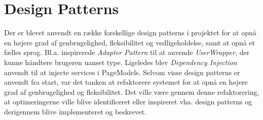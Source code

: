 \section{Design Patterns}
\label{sec:design-patterns}
Der er blevet anvendt en række forskellige design patterns i projektet for at opnå en højere grad af genbrugelighed, fleksibilitet og vedligeholdelse, samt at opnå et fælles sprog.
Bl.a. inspirerede \emph{Adapter Pattern} til at anvende \emph{UserWrapper}, der kunne håndtere brugeren uanset type. Ligeledes blev \emph{Dependency Injection} anvendt til at injecte services i PageModels.
Selvom visse design patterns er anvendt fra start, var det tanken at refaktorere systemet for at opnå en højere grad af genbrugelighed og fleksibilitet.
Det ville være gennem denne refaktorering, at optimeringerne ville blive identificeret eller inspireret vha. design patterns og derigennem blive implementeret og beskrevet.

